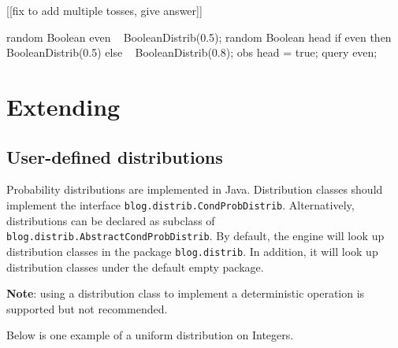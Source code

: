 \documentclass[12pt]{article}
\begin{document}
[[fix to add multiple tosses, give answer]]
\begin{blogcode}
random Boolean even ~ BooleanDistrib(0.5);
random Boolean head 
  if even then ~ BooleanDistrib(0.5)
  else ~ BooleanDistrib(0.8);
obs head = true;
query even;
\end{blogcode}



\section{Extending \bl}\label{-section}
\subsection{User-defined distributions}\label{user-defined-distribution-section}
Probability distributions are implemented in Java.  Distribution classes should implement the interface \verb|blog.distrib.CondProbDistrib|.
Alternatively, distributions can be declared as subclass of \verb|blog.distrib.AbstractCondProbDistrib|. 
By default, the \bl engine will look up distribution classes in the package \verb|blog.distrib|. In addition, it will look up distribution classes under the default empty package. 

{\bf Note}: using a distribution class to implement a deterministic operation is supported but not recommended. 

Below is one example of a uniform distribution on Integers.
\end{document}

